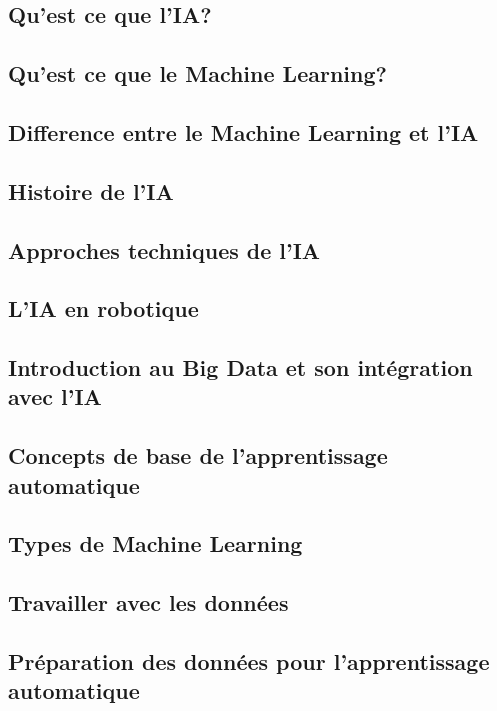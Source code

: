 \documentclass{beamer}
\begin{document}
\subsection{Qu'est ce que l'IA?}
\subsection{Qu'est ce que le Machine Learning?}
\subsection{Difference entre le Machine Learning et l'IA}
\subsection{Histoire de l'IA}
\subsection{Approches techniques de l'IA}
\subsection{L'IA en robotique}
\subsection{Introduction au Big Data et son intégration avec l'IA}
\subsection{Concepts de base de l'apprentissage automatique}
\subsection{Types de Machine Learning}
\subsection{Travailler avec les données}
\subsection{Préparation des données pour l'apprentissage automatique}
\end{document}
